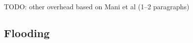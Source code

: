 TODO: other overhead based on Mani et al (1--2 paragraphs)

\subsection{Flooding} \label{sec:flooding}

%
%
%
%
